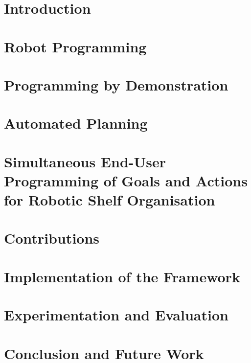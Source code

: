 \documentclass[a4paper,12pt,twoside]{book}
\theoremstyle{definition}
\theoremstyle{remark}
\begin{document}
%
\tableofcontents
\listoffigures

\chapter{Introduction} \label{chap:Intro}


\chapter{Robot Programming}\label{chap:Sota}

\chapter{Programming by Demonstration}\label{chap:Sota-PbD}


\chapter{Automated Planning}\label{chap:Sota-AP}


\chapter{Simultaneous End-User Programming of Goals and Actions for Robotic Shelf Organisation}\label{chap:OrganisingTasks}


\chapter{Contributions}\label{chap:Contribution}


\chapter{Implementation of the Framework}\label{chap:Implementation}


\chapter{Experimentation and Evaluation}\label{chap:Evaluation}


\chapter{Conclusion and Future Work}\label{chap:Conclusion}



\clearpage


\end{document}

